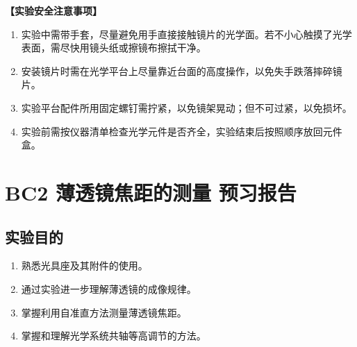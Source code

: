 \documentclass[dvipsnames, svgnames,a4paper,11pt]{article}
\begin{document}
	\textbf{【实验安全注意事项】}	
	\begin{enumerate}
		\item 实验中需带手套，尽量避免用手直接接触镜片的光学面。若不小心触摸了光学表面，需尽快用镜头纸或擦镜布擦拭干净。	
		\item 安装镜片时需在光学平台上尽量靠近台面的高度操作，以免失手跌落摔碎镜片。
		\item 实验平台配件所用固定螺钉需拧紧，以免镜架晃动；但不可过紧，以免损坏。
		\item 实验前需按仪器清单检查光学元件是否齐全，实验结束后按照顺序放回元件盒。
	\end{enumerate}

	


 
	\clearpage
	\tableofcontents
	\clearpage



	\setcounter{section}{0}
	\section{BC2 薄透镜焦距的测量 \quad\heiti 预习报告}
	
	\subsection{实验目的}
	\begin{enumerate}
		\item 熟悉光具座及其附件的使用。
		\item 通过实验进一步理解薄透镜的成像规律。
		\item 掌握利用自准直方法测量薄透镜焦距。
		\item 掌握和理解光学系统共轴等高调节的方法。
	\end{enumerate}
	
\end{document}
